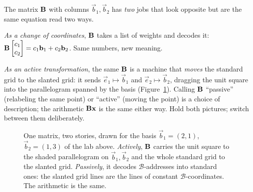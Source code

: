 The matrix $\mathbf{B}$ with columns $\vec{b}_1,\vec{b}_2$ has \emph{two} jobs
that look opposite but are the same equation read two ways.

\emph{As a change of coordinates}, $\mathbf{B}$ takes a list of weights and decodes
it: $\mathbf{B}\begin{bmatrix}c_1\\c_2\end{bmatrix}=c_1\mathbf{b}_1+c_2\mathbf{b}_2$. Same numbers, new
meaning.

\emph{As an active transformation}, the same $\mathbf{B}$ is a machine that
\emph{moves} the standard grid to the slanted grid: it sends $\vec{e}_1\mapsto\vec{b}_1$
and $\vec{e}_2\mapsto\vec{b}_2$, dragging the unit square into the parallelogram
spanned by the basis (Figure~\ref{ch31:fig-active-passive}). Calling $\mathbf{B}$
``passive'' (relabeling the same point) or ``active'' (moving the point) is a
choice of description; the arithmetic $\mathbf{B}\mathbf{x}$ is the same either way.
Hold both pictures; switch between them deliberately.

\begin{figure}[H]
\centering
{}
\caption{One matrix, two stories, drawn for the basis
$\vec{b}_1=(2,1)$, $\vec{b}_2=(1,3)$ of the lab above. \emph{Actively}, $\mathbf{B}$
carries the unit square to the shaded parallelogram on $\vec{b}_1,\vec{b}_2$ and the
whole standard grid to the slanted grid. \emph{Passively}, it decodes
$\mathcal{B}$-addresses into standard ones: the slanted grid lines are the lines
of constant $\mathcal{B}$-coordinates. The arithmetic is the same.}
\label{ch31:fig-active-passive}
\end{figure}

